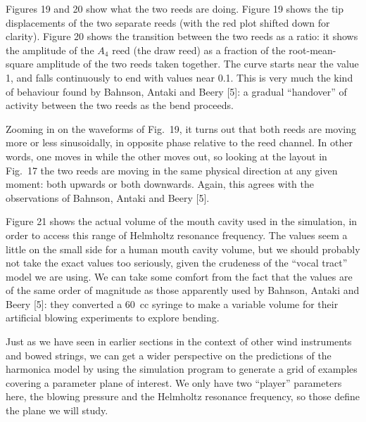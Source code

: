   Figures 19 and 20 show what the two reeds are doing. Figure 19 shows the tip 
  displacements of the two separate reeds (with the red plot shifted down for 
  clarity). Figure 20 shows the transition between the two reeds as a ratio: it 
  shows the amplitude of the $A_4$ reed (the draw reed) as a fraction of the 
  root-mean-square amplitude of the two reeds taken together. The curve starts 
  near the value 1, and falls continuously to end with values near 0.1. This is 
  very much the kind of behaviour found by Bahnson, Antaki and Beery [5]: a 
  gradual “handover” of activity between the two reeds as the bend proceeds. 



  Zooming in on the waveforms of Fig.\ 19, it turns out that both reeds are 
  moving more or less sinusoidally, in opposite phase relative to the reed 
  channel. In other words, one moves in while the other moves out, so looking 
  at the layout in Fig.\ 17 the two reeds are moving in the same physical 
  direction at any given moment: both upwards or both downwards. Again, this 
  agrees with the observations of Bahnson, Antaki and Beery [5]. 

  Figure 21 shows the actual volume of the mouth cavity used in the simulation, 
  in order to access this range of Helmholtz resonance frequency. The values 
  seem a little on the small side for a human mouth cavity volume, but we 
  should probably not take the exact values too seriously, given the crudeness 
  of the “vocal tract” model we are using. We can take some comfort from the 
  fact that the values are of the same order of magnitude as those apparently 
  used by Bahnson, Antaki and Beery [5]: they converted a 60~cc syringe to make 
  a variable volume for their artificial blowing experiments to explore 
  bending. 


  Just as we have seen in earlier sections in the context of other wind 
  instruments and bowed strings, we can get a wider perspective on the 
  predictions of the harmonica model by using the simulation program to 
  generate a grid of examples covering a parameter plane of interest. We only 
  have two “player” parameters here, the blowing pressure and the Helmholtz 
  resonance frequency, so those define the plane we will study. 

